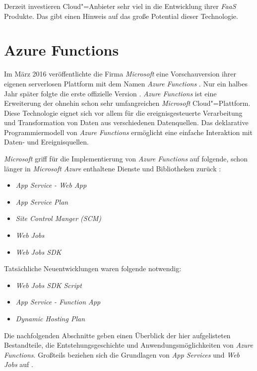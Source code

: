 Derzeit investieren Cloud"=Anbieter sehr viel in die Entwicklung ihrer \textit{FaaS} Produkte. Das gibt einen Hinweis auf das große Potential dieser Technologie.

\section{Azure Functions}

Im März 2016 veröffentlichte die Firma \textit{Microsoft} eine Vorschauversion ihrer eigenen serverlosen Plattform mit dem Namen \textit{Azure Functions} \cite{AzFunIntro}. Nur ein halbes Jahr später folgte die erste offizielle Version \cite{AzFunGA}. \textit{Azure Functions} ist eine Erweiterung der ohnehin schon sehr umfangreichen \textit{Microsoft} Cloud"=Plattform. Diese Technologie eignet sich vor allem für die ereignisgesteuerte Verarbeitung und Transformation von Daten aus verschiedenen Datenquellen. Das deklarative Programmiermodell von \textit{Azure Functions} ermöglicht eine einfache Interaktion mit Daten- und Ereignisquellen. 

\textit{Microsoft} griff für die Implementierung von \textit{Azure Functions} auf folgende, schon länger in \textit{Microsoft Azure} enthaltene Dienste und Bibliotheken zurück \cite{AzFunJourney}:

\begin{itemize}
	\item \textit{App Service - Web App}
	\item \textit{App Service Plan}
	\item \textit{Site Control Manger (SCM)}
	\item \textit{Web Jobs}
	\item \textit{Web Jobs SDK}
\end{itemize}
Tatsächliche Neuentwicklungen waren folgende notwendig:
\begin{itemize}
	\item \textit{Web Jobs SDK Script}
	\item \textit{App Service - Function App}
	\item \textit{Dynamic Hosting Plan}
\end{itemize}

Die nachfolgenden Abschnitte geben einen Überblick der hier aufgelisteten Bestandteile, die Entstehungsgeschichte und Anwendungsmöglichkeiten von \textit{Azure Functions}. Großteils beziehen sich die Grundlagen von \textit{App Services} und \textit{Web Jobs} auf \cite{AzWebEssentials4Devs}.


